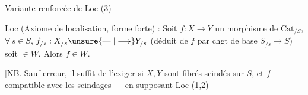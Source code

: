 Variante renforcée de \uline{Loc} (3)

\uline{Loc}  (Axiome de localisation, forme forte) : Soit $f:X\longrightarrow Y$ un morphisme de $\mathrm{Cat}_{/S}$,   $\forall\,s\in S$, $f_{/s}:X_{/s}\unsure{\mathrel{\text{---}}|\longrightarrow}Y_{/s}$ (déduit de $f$ par chgt de base $S_{/s}\longrightarrow S$) soit $\in W$. Alors $f\in W$.

[NB. Sauf erreur, il suffit de l'exiger si $X,Y$ sont  fibrés scindés sur $S$, et $f$  compatible avec les scindages --- en supposant Loc (1,2)

